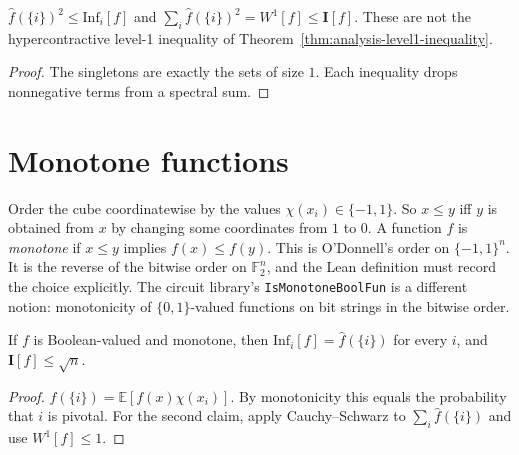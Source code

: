 \begin{proposition}
  \label{prop:analysis-level1-elementary}
  \leanok
  $\widehat{f}(\{i\})^2 \le \mathrm{Inf}_i[f]$ and
  $\sum_i \widehat{f}(\{i\})^2 = W^1[f] \le \mathbf{I}[f]$. These are not the
  hypercontractive level-1 inequality of
  Theorem~\ref{thm:analysis-level1-inequality}.
\end{proposition}
\begin{proof}
  \leanok
  The singletons are exactly the sets of size $1$. Each inequality drops
  nonnegative terms from a spectral sum.
\end{proof}

\section{Monotone functions}

\begin{definition}
  \label{def:analysis-monotone}
  Order the cube coordinatewise by the values $\chi(x_i) \in \{-1, 1\}$. So
  $x \le y$ iff $y$ is obtained from $x$ by changing some coordinates from $1$ to
  $0$. A function $f$ is \emph{monotone} if $x \le y$ implies $f(x) \le f(y)$.
  This is O'Donnell's order on $\{-1,1\}^n$. It is the reverse of the bitwise
  order on $\mathbb{F}_2^n$, and the Lean definition must record the choice
  explicitly. The circuit library's \texttt{IsMonotoneBoolFun} is a different
  notion: monotonicity of $\{0,1\}$-valued functions on bit strings in the
  bitwise order.
\end{definition}

\begin{theorem}
  \label{thm:analysis-monotone-influence}
  \notready
  If $f$ is Boolean-valued and monotone, then
  $\mathrm{Inf}_i[f] = \widehat{f}(\{i\})$ for every $i$, and
  $\mathbf{I}[f] \le \sqrt{n}$.
\end{theorem}
\begin{proof}
  $\widehat{f}(\{i\}) = \mathbb{E}[f(x)\chi(x_i)]$. By monotonicity this equals
  the probability that $i$ is pivotal. For the second claim, apply Cauchy--Schwarz
  to $\sum_i \widehat{f}(\{i\})$ and use $W^1[f] \le 1$.
\end{proof}

